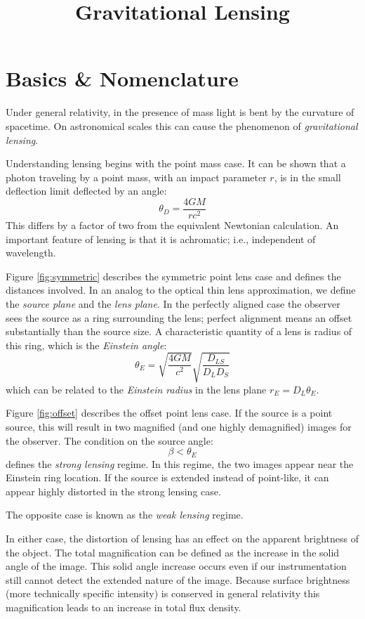 \title{\bf Gravitational Lensing}

\section{Basics \& Nomenclature}

Under general relativity, in the presence of mass light is bent by the
curvature of spacetime. On astronomical scales this can cause the
phenomenon of {\it gravitational lensing}. 

Understanding lensing begins with the point mass case. It can be shown
that a photon traveling by a point mass, with an impact parameter $r$,
is in the small deflection limit deflected by an angle:
\begin{equation}
\theta_D = \frac{4GM}{rc^2} 
\end{equation}
This differs by a factor of two from the equivalent Newtonian
calculation. An important feature of lensing is that it is achromatic;
i.e., independent of wavelength.

Figure \ref{fig:symmetric} describes the symmetric point lens case and
defines the distances involved. In an analog to the optical thin lens
approximation, we define the {\it source plane} and the {\it lens
  plane}. In the perfectly aligned case the observer sees the source
as a ring surrounding the lens; perfect alignment means an offset
substantially than the source size.  A characteristic quantity of a
lens is radius of this ring, which is the {\it Einstein angle}:
\begin{equation}
\theta_E =  \sqrt{\frac{4GM}{c^2}} \sqrt{\frac{D_{LS}}{D_L D_S}}
\end{equation}
which can be related to the {\it Einstein radius} in the lens plane
$r_E = D_L \theta_E$.

Figure \ref{fig:offset} describes the offset point lens case. If the
source is a point source, this will result in two magnified (and one
highly demagnified) images for the observer. The condition on the
source angle:
\begin{equation}
\beta < \theta_E
\end{equation}
defines the {\it strong lensing} regime. In this regime, the two
images appear near the Einstein ring location. If the source is
extended instead of point-like, it can appear highly distorted in the
strong lensing case.

The opposite case is known as the {\it weak lensing} regime. 

In either case, the distortion of lensing has an effect on the
apparent brightness of the object. The total magnification can be
defined as the increase in the solid angle of the image. This solid
angle increase occurs even if our instrumentation still cannot detect
the extended nature of the image. Because surface brightness (more
technically specific intensity) is conserved in general relativity
this magnification leads to an increase in total flux density.

